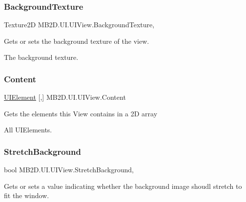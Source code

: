 \subsubsection{\texorpdfstring{Background\+Texture}{BackgroundTexture}}
{\footnotesize\ttfamily Texture2D M\+B2\+D.\+U\+I.\+U\+I\+View.\+Background\+Texture\hspace{0.3cm}{\ttfamily [get]}, {\ttfamily [set]}}



Gets or sets the background texture of the view. 

The background texture.\hypertarget{class_m_b2_d_1_1_u_i_1_1_u_i_view_a873fb2ef0e28bf1d96056e43a6fe18da}{}\label{class_m_b2_d_1_1_u_i_1_1_u_i_view_a873fb2ef0e28bf1d96056e43a6fe18da} 
\subsubsection{\texorpdfstring{Content}{Content}}
{\footnotesize\ttfamily \hyperlink{class_m_b2_d_1_1_u_i_1_1_u_i_element}{U\+I\+Element} \mbox{[},\mbox{]} M\+B2\+D.\+U\+I.\+U\+I\+View.\+Content\hspace{0.3cm}{\ttfamily [get]}}



Gets the elements this View contains in a 2D array 

All U\+I\+Elements.\hypertarget{class_m_b2_d_1_1_u_i_1_1_u_i_view_a715db505a27aeb27dd14c1108bda322f}{}\label{class_m_b2_d_1_1_u_i_1_1_u_i_view_a715db505a27aeb27dd14c1108bda322f} 
\subsubsection{\texorpdfstring{Stretch\+Background}{StretchBackground}}
{\footnotesize\ttfamily bool M\+B2\+D.\+U\+I.\+U\+I\+View.\+Stretch\+Background\hspace{0.3cm}{\ttfamily [get]}, {\ttfamily [set]}}



Gets or sets a value indicating whether the background image shoudl stretch to fit the window. 

